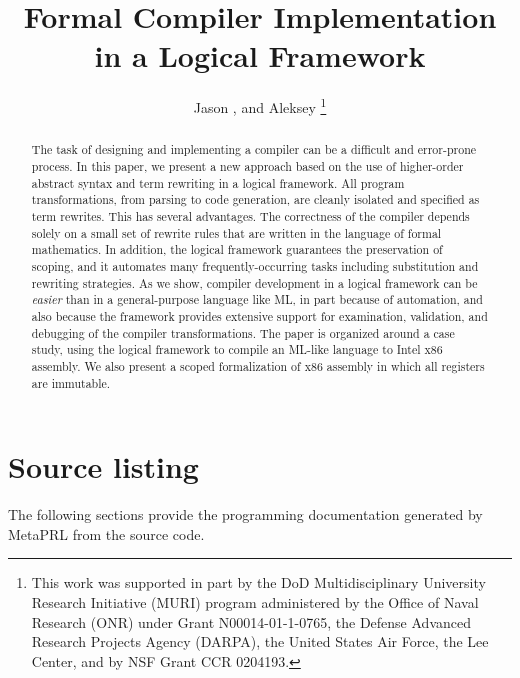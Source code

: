 \documentclass{kluwer}
\begin{document}
\begin{article}
\begin{opening}

\title{Formal Compiler Implementation in a Logical Framework}

\author{Jason , and Aleksey \thanks{This
  work was supported in part by the DoD Multidisciplinary
  University Research Initiative (MURI) program administered by the
  Office of Naval Research (ONR) under Grant N00014-01-1-0765, the
  Defense Advanced Research Projects Agency (DARPA), the United States
  Air Force, the Lee Center, and by NSF Grant CCR 0204193.}}


\begin{abstract}
The task of designing and implementing a compiler can be a
difficult and error-prone process.  In this paper, we present a new
approach based on the use of higher-order abstract syntax and term
rewriting in a logical framework.  All program transformations, from
parsing to code generation, are cleanly isolated and specified as term
rewrites.  This has several advantages.  The correctness of the
compiler depends solely on a small set of rewrite rules that are
written in the language of formal mathematics.  In addition, the logical
framework guarantees the preservation of scoping, and it automates
many frequently-occurring tasks including substitution and rewriting
strategies.  As we show, compiler development in a logical framework
can be \emph{easier} than in a general-purpose language like ML, in
part because of automation, and also because the framework provides
extensive support for examination, validation, and debugging of the
compiler transformations.  The paper is organized around a case study,
using the \MetaPRL{} logical framework to compile an ML-like language to
Intel x86 assembly.  We also present a scoped formalization of x86
assembly in which all registers are immutable.

\end{abstract}
\end{opening}


\newpage
\section{Source listing}

The following sections provide the programming documentation
generated by MetaPRL from the source code.






\end{article}
\end{document}
